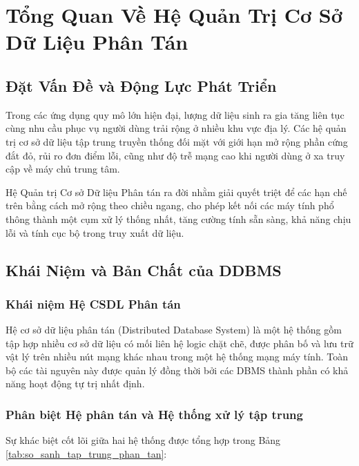 \documentclass[12pt,a4paper]{report}
\begin{document}
\chapter{Tổng Quan Về Hệ Quản Trị Cơ Sở Dữ Liệu Phân Tán}

\section{Đặt Vấn Đề và Động Lực Phát Triển}
Trong các ứng dụng quy mô lớn hiện đại, lượng dữ liệu sinh ra gia tăng liên tục cùng nhu cầu phục vụ người dùng trải rộng ở nhiều khu vực địa lý. Các hệ quản trị cơ sở dữ liệu tập trung truyền thống đối mặt với giới hạn mở rộng phần cứng đắt đỏ, rủi ro đơn điểm lỗi, cũng như độ trễ mạng cao khi người dùng ở xa truy cập về máy chủ trung tâm. 

Hệ Quản trị Cơ sở Dữ liệu Phân tán ra đời nhằm giải quyết triệt để các hạn chế trên bằng cách mở rộng theo chiều ngang, cho phép kết nối các máy tính phổ thông thành một cụm xử lý thống nhất, tăng cường tính sẵn sàng, khả năng chịu lỗi và tính cục bộ trong truy xuất dữ liệu.

\section{Khái Niệm và Bản Chất của DDBMS}

\subsection{Khái niệm Hệ CSDL Phân tán}
Hệ cơ sở dữ liệu phân tán (Distributed Database System) là một hệ thống gồm tập hợp nhiều cơ sở dữ liệu có mối liên hệ logic chặt chẽ, được phân bố và lưu trữ vật lý trên nhiều nút mạng khác nhau trong một hệ thống mạng máy tính. Toàn bộ các tài nguyên này được quản lý đồng thời bởi các DBMS thành phần có khả năng hoạt động tự trị nhất định.

\subsection{Phân biệt Hệ phân tán và Hệ thống xử lý tập trung}
Sự khác biệt cốt lõi giữa hai hệ thống được tổng hợp trong Bảng \ref{tab:so_sanh_tap_trung_phan_tan}:
\end{document}

